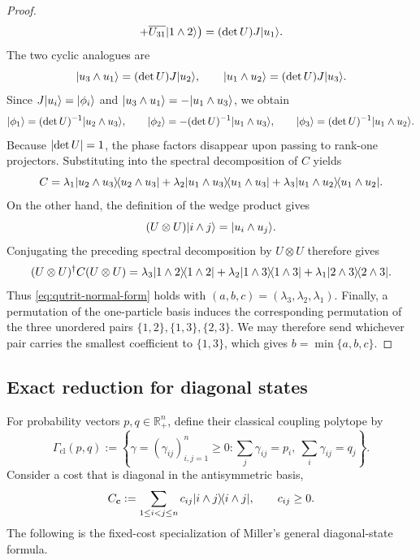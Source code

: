 \documentclass[11pt]{article}
\newcommand{\ketbra}[2]{\ensuremath{\ket{#1}\!\bra{#2}}}
\DeclarePairedDelimiter\abs{\lvert}{\rvert}
\DeclarePairedDelimiter\ket{\lvert}{\rangle}
\DeclarePairedDelimiter\bra{\langle}{\rvert}
\begin{document}
\begin{proof}
\[           +\overline{U_{31}}\ket{1\wedge2}
          \bigr)
        =(\det U)J\ket{u_1}.
    \]
    The two cyclic analogues are
    \[
        \ket{u_3\wedge u_1}=(\det U)J\ket{u_2},
        \qquad
        \ket{u_1\wedge u_2}=(\det U)J\ket{u_3}.
    \]
    Since $J\ket{u_i}=\ket{\phi_i}$ and
    $\ket{u_3\wedge u_1}=-\ket{u_1\wedge u_3}$, we obtain
    \[
        \ket{\phi_1}=(\det U)^{-1}\ket{u_2\wedge u_3},
        \qquad
        \ket{\phi_2}=-(\det U)^{-1}\ket{u_1\wedge u_3},
        \qquad
        \ket{\phi_3}=(\det U)^{-1}\ket{u_1\wedge u_2}.
    \]
    Because $\abs{\det U}=1$, the phase factors disappear upon passing to
    rank-one projectors.  Substituting into the spectral decomposition of
    $C$ yields
    \[
        C
        =\lambda_1\ketbra{u_2\wedge u_3}{u_2\wedge u_3}
         +\lambda_2\ketbra{u_1\wedge u_3}{u_1\wedge u_3}
         +\lambda_3\ketbra{u_1\wedge u_2}{u_1\wedge u_2}.
    \]
    On the other hand, the definition of the wedge product gives
    \[
        (U\otimes U)\ket{i\wedge j}=\ket{u_i\wedge u_j}.
    \]
    Conjugating the preceding spectral decomposition by $U\otimes U$
    therefore gives
    \[
        (U\otimes U)^\dagger C(U\otimes U)
        =\lambda_3\ketbra{1\wedge2}{1\wedge2}
         +\lambda_2\ketbra{1\wedge3}{1\wedge3}
         +\lambda_1\ketbra{2\wedge3}{2\wedge3}.
    \]
    Thus \eqref{eq:qutrit-normal-form} holds with
    $(a,b,c)=(\lambda_3,\lambda_2,\lambda_1)$.  Finally, a permutation of
    the one-particle basis induces the corresponding permutation of the
    three unordered pairs $\{1,2\},\{1,3\},\{2,3\}$.  We may therefore
    send whichever pair carries the smallest coefficient to $\{1,3\}$,
    which gives $b=\min\{a,b,c\}$.
\end{proof}

\subsection{Exact reduction for diagonal states}

For probability vectors $p,q\in\mathbb{R}_+^n$, define their classical
coupling polytope by
\begin{equation}\label{eq:classical-coupling-polytope}
    \Gamma_{\mathrm{cl}}(p,q)
    :=
    \left\{
        \gamma=(\gamma_{ij})_{i,j=1}^n\geq0:
        \sum_j\gamma_{ij}=p_i,\ 
        \sum_i\gamma_{ij}=q_j
    \right\}.
\end{equation}
Consider a cost that is diagonal in the antisymmetric basis,
\begin{equation}\label{eq:weighted-antisymmetric-cost}
    C_{\bm c}
    :=\sum_{1\leq i<j\leq n}
    c_{ij}\ketbra{i\wedge j}{i\wedge j},
    \qquad c_{ij}\geq0.
\end{equation}
The following is the fixed-cost specialization of Miller's general
diagonal-state formula.
\end{document}
